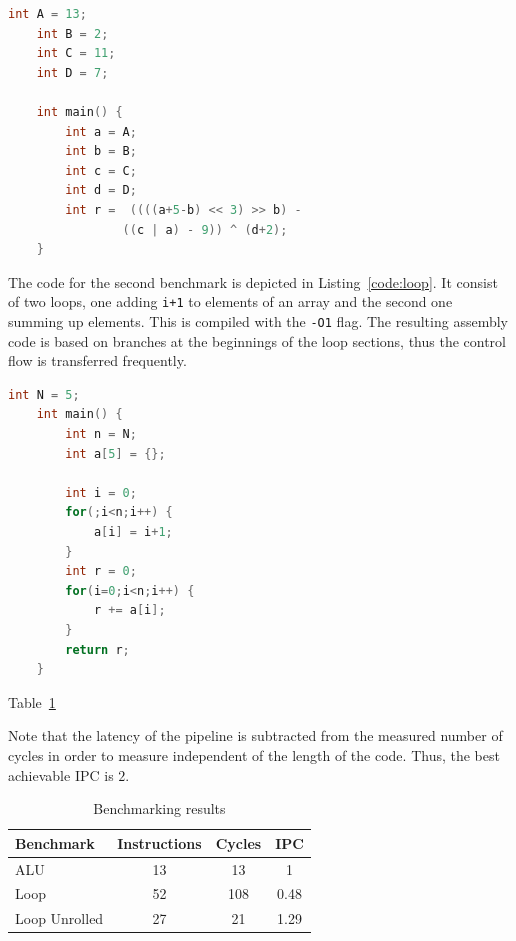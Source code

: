 \documentclass[conference]{IEEEtran}
\begin{document}
\begin{lstlisting}[language=C, caption=Code for the ALU benchmark, label=code:alu]
	int A = 13;
	int B = 2;
	int C = 11;
	int D = 7;

	int main() {
		int a = A;
		int b = B;
		int c = C;
		int d = D;
		int r =  ((((a+5-b) << 3) >> b) -
				((c | a) - 9)) ^ (d+2);
	}
\end{lstlisting}

The code for the second benchmark is depicted in Listing~\ref{code:loop}. It consist of two loops, one adding \verb|i+1| to elements of an array and the second one summing up elements. This is compiled with the \verb|-O1| flag. The resulting assembly code is based on branches at the beginnings of the loop sections, thus the control flow is transferred frequently.

\begin{lstlisting}[language=C, caption=Code for the loop benchmark, label=code:loop]
	int N = 5;
	int main() {
		int n = N;
		int a[5] = {};

		int i = 0;
		for(;i<n;i++) {
			a[i] = i+1;
		}
		int r = 0;
		for(i=0;i<n;i++) {
			r += a[i];
		}
		return r;
	}
\end{lstlisting}

Table~\ref{tab:results}

Note that the latency of the pipeline is subtracted from the measured number of cycles in order to measure independent of the length of the code. Thus, the best achievable IPC is $2$.

\begin{table} [h]
	\caption{Benchmarking results}
	\centering
	\begin{tabular}{l c c c}
			Benchmark & Instructions & Cycles & IPC \\
		\midrule
			ALU & 13 & 13 & 1 \\
			Loop & 52 & 108 & 0.48 \\
			Loop Unrolled & 27 & 21 & 1.29
	\end{tabular}
	\label{tab:results}
\end{table}

\end{document}
